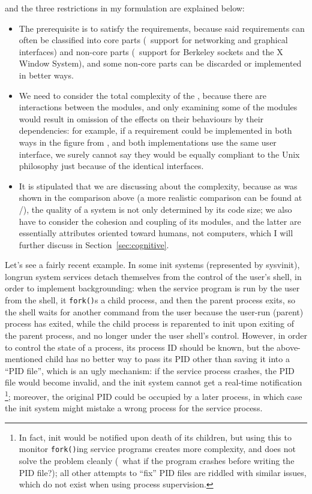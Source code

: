 and the three restrictions in my formulation are explained below:
\begin{itemize}
\item The prerequisite is to  satisfy the requirements,
	because said requirements can often be classified into core parts
	(\eg~support for networking and graphical interfaces) and non-core
	parts (\eg~support for Berkeley sockets and the X Window System),
	and some non-core parts can be discarded or implemented in better ways.
\item We need to consider the total complexity of the , because
	there are interactions between the modules, and only examining some of the
	modules would result in omission of the effects on their behaviours by
	their dependencies: for example, if a requirement could be implemented in	
	both ways in the figure from \parencite{litt2014a}, and both implementations
	use the same user interface, we surely cannot say they would be equally
	compliant to the Unix philosophy just because of the identical interfaces.
\item It is stipulated that we are discussing about the 
	complexity, because as was shown in the comparison above (a more realistic
	comparison can be found at \parencite{github:acmetiny}/\parencite%
	{gitlab:emca}), the quality of a system is not only determined by its code
	size; we also have to consider the cohesion and coupling of its modules,
	and the latter are essentially attributes oriented toward humans, not
	computers, which I will further discuss in Section~\ref{sec:cognitive}.
\end{itemize}

Let's see a fairly recent example.  In some init systems (represented by
sysvinit), longrun system services detach themselves from the control of the
user's shell, in order to implement backgrounding:
when the service program is run by the user from the shell, it \verb|fork()|s a
child process, and then the parent process exits, so the shell waits for another
command from the user because the user-run (parent) process has exited, while
the child process is reparented to init upon exiting of the parent process, and
no longer under the user shell's control.  However, in order to control the
state of a process, its process ID should be known, but the above-mentioned
child has no better way to pass its PID other than saving it into a ``PID
file'', which is an ugly mechanism: if the service process crashes, the PID file
would become invalid, and the init system cannot get a real-time notification%
\footnote{In fact, init would be notified upon death of its children, but using
this to monitor \texttt{fork()}ing service programs creates more complexity,
and does not solve the problem cleanly (\eg~what if the program crashes before
writing the PID file?); all other attempts to ``fix'' PID files are riddled
with similar issues, which do not exist when using process supervision.};
moreover, the original PID could be occupied by a later process, in which
case the init system might mistake a wrong process for the service process.

